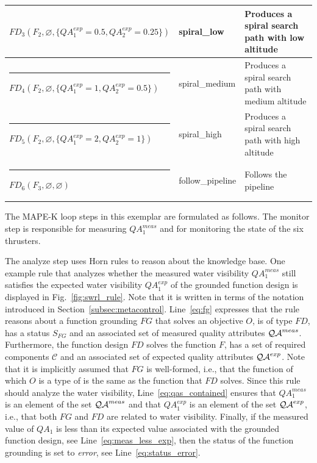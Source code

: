 \begin{table}
\begin{tabular}{|@{\;}>{\raggedright\arraybackslash}p{3.5cm}@{\;\,}|@{\;}p{3.0cm}@{\,}|>{\raggedright\arraybackslash}p{2.7cm}@{\;}|}
        $FD_3(F_2, \varnothing, \{QA_1^{exp}=0.5, QA_2^{exp}=0.25\})$ & spiral\_low & Produces a spiral search path with low altitude \\ %
        \hline
        \rule{-3pt}{2ex}
        $FD_4(F_2, \varnothing, \{QA_1^{exp}=1, QA_2^{exp}=0.5\})$ & spiral\_medium & Produces a spiral search path with medium altitude \\ %
        \hline
        \rule{-3pt}{2ex}
        $FD_5(F_2, \varnothing, \{QA_1^{exp}=2, QA_2^{exp}=1\})$ & spiral\_high & Produces a spiral search path with high altitude \\ %
        \hline
        \rule{-3pt}{2ex}
        $FD_6(F_3, \varnothing, \varnothing)$ & follow\_pipeline & Follows the pipeline \\
        \hline
    \end{tabular}
\end{table}

The MAPE-K loop steps in this exemplar are formulated as follows. The monitor step is responsible for measuring $QA_1^{meas}$ and for monitoring the state of the six thrusters.

The analyze step uses Horn rules
to reason about the knowledge base. One example rule that analyzes whether the measured water visibility $QA_1^{meas}$ still satisfies the expected water visibility $QA_1^{exp}$ of the grounded function design is displayed in Fig.~\ref{fig:swrl_rule}. Note that it is written in terms of the notation introduced in Section~\ref{subsec:metacontrol}. Line~\ref{eq:fg} expresses that the rule reasons about a function grounding $FG$ that solves an objective $O$, is of type $FD$, has a status $S_{FG}$ and an associated set of measured quality attributes $\operatorname{\mathcal{QA}}^{meas}$. Furthermore, the function design $FD$ solves the function $F$, has a set of required components $\mathcal{C}$ and an associated set of expected quality attributes $\operatorname{\mathcal{QA}}^{exp}$. Note that it is implicitly assumed that $FG$ is well-formed, i.e., that the function of which $O$ is a type of is the same as the function that $FD$ solves. Since this rule should analyze the water visibility, Line~\ref{eq:qas_contained} ensures that $QA_1^{meas}$ is an element of the set $\operatorname{\mathcal{QA}}^{meas}$ and that $QA_1^{exp}$ is an element of the set $\operatorname{\mathcal{QA}}^{exp}$, i.e., that both $FG$ and $FD$ are related to water visibility. Finally, if the measured value of $QA_1$ is less than its expected value associated with the grounded function design, see Line~\ref{eq:meas_less_exp}, then the status of the function grounding is set to \emph{error}, see Line~\ref{eq:status_error}. %

